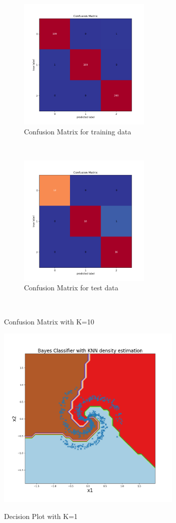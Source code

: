 \begin{figure}[!ht]
    \centering
    \begin{subfigure}[t]{0.5\textwidth}
        \centering
        \includegraphics[height=2.5in]{Dataset_1b/K_10_cmatrix_train_data_bayes.png}
        \caption{Confusion Matrix for training data}
    \end{subfigure}%
    ~ 
    \begin{subfigure}[t]{0.5\textwidth}
        \centering
        \includegraphics[height=2.5in]{Dataset_1b/K_10_cmatrix_test_data_bayes.png}
        \caption{Confusion Matrix for test data}
    \end{subfigure}%
    ~
    \caption{Confusion Matrix with K=10}
    \label{fig:23}
\end{figure}

\begin{figure}[!ht]
    \centering
    \includegraphics[height=3.5in]{Dataset_1b/K_10_decision_plot_bayes.png}
\     \caption{Decision Plot with K=1}
    \label{fig:24}
\end{figure}
\newpage
